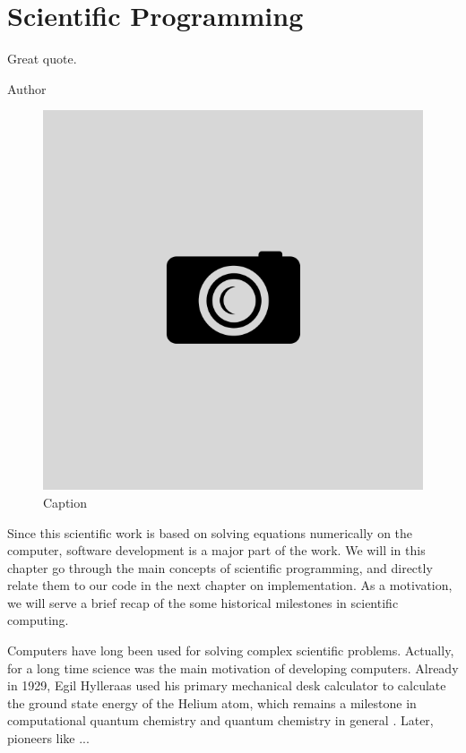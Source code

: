 \chapter{Scientific Programming} \label{chp:scientificprogramming}
\epigraph{Great quote.}{Author}
\begin{figure}[H]
	\centering
	\includegraphics[scale=0.4]{Images/example.png}
	\caption{Caption}
\end{figure}

Since this scientific work is based on solving equations numerically on the computer, software development is a major part of the work. We will in this chapter go through the main concepts of scientific programming, and directly relate them to our code in the next chapter on implementation. As a motivation, we will serve a brief recap of the some historical milestones in scientific computing.

Computers have long been used for solving complex scientific problems. Actually, for a long time science was the main motivation of developing computers. Already in 1929, Egil Hylleraas used his primary mechanical desk calculator to calculate the ground state energy of the Helium atom, which remains a milestone in computational quantum chemistry and quantum chemistry in general \cite{helgaker_perspective_2000}. Later, pioneers like ...

